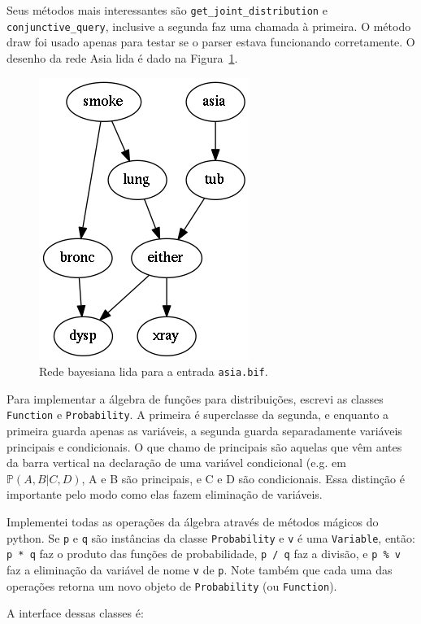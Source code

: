 \documentclass[paper=a4, fontsize=11pt]{scrartcl} %
\numberwithin{equation}{subsection}
\numberwithin{figure}{subsection}
\numberwithin{table}{subsection}
\numberwithin{definition}{subsection}
\numberwithin{theorem}{subsection}
\numberwithin{property}{subsection}
\numberwithin{proposition}{subsection}
\numberwithin{equation}{section}
\numberwithin{figure}{section}
\numberwithin{table}{section}
\numberwithin{definition}{section}
\numberwithin{theorem}{section}
\numberwithin{property}{section}
\numberwithin{proposition}{section}
\renewcommand{\P}{\mathbb{P}}
\begin{document}
Seus métodos mais interessantes são \verb|get_joint_distribution| e \verb|conjunctive_query|, inclusive a segunda faz uma chamada à primeira. O método draw foi usado apenas para testar se o parser estava funcionando corretamente. O desenho da rede Asia lida é dado na Figura~\ref{fig:asianet}.

\begin{figure}[hbtp]
\centering
\includegraphics[scale=0.7]{images/asianet.png}
\caption{Rede bayesiana lida para a entrada \texttt{asia.bif}.}
\label{fig:asianet}
\end{figure}

Para implementar a álgebra de funções para distribuições, escrevi as classes \verb|Function| e \verb|Probability|. A primeira é superclasse da segunda, e enquanto a primeira guarda apenas as variáveis, a segunda guarda separadamente variáveis principais e condicionais. O que chamo de principais são aquelas que vêm antes da barra vertical na declaração de uma variável condicional (e.g. em $\P(A, B| C, D)$, A e B são principais, e C e D são condicionais. Essa distinção é importante pelo modo como elas fazem eliminação de variáveis.

Implementei todas as operações da álgebra através de métodos mágicos do python. Se \verb|p| e \verb|q| são instâncias da classe \verb|Probability| e \verb|v| é uma \verb|Variable|, então: \verb|p * q| faz o produto das funções de probabilidade, \verb|p / q| faz a divisão, e \verb|p % v| faz a eliminação da variável de nome \verb|v| de \verb|p|. Note também que cada uma das operações retorna um novo objeto de \verb|Probability| (ou \verb|Function|).

A interface dessas classes é:
\end{document}
